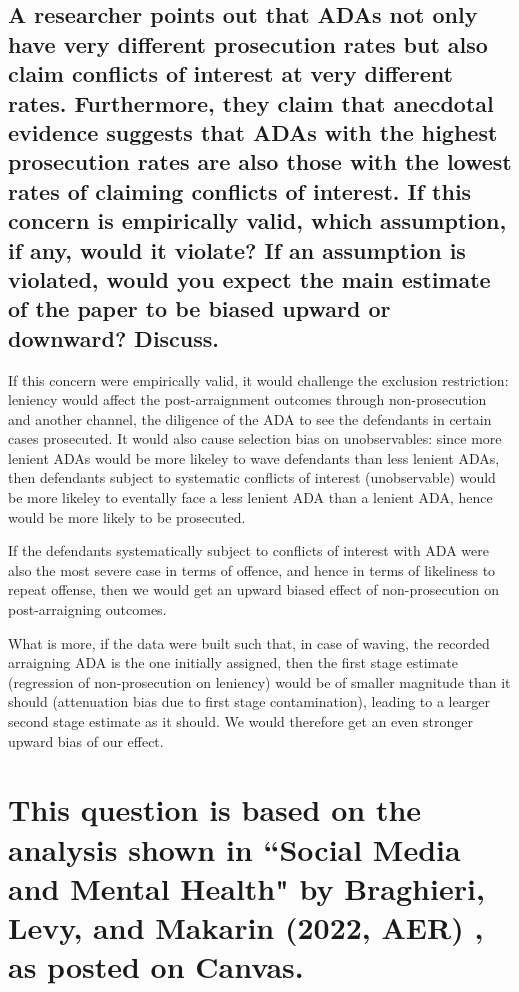\documentclass{article}
\begin{document}
\subsection{A researcher points out that ADAs not only have very different prosecution rates but also claim conflicts of interest at very different rates. Furthermore, they claim that anecdotal evidence suggests that ADAs with the highest prosecution rates are also those with the lowest rates of claiming conflicts of interest. If this concern is empirically valid, which assumption, if any, would it violate? If an assumption is violated, would you expect the main estimate of the paper to be biased upward or downward? Discuss.}

If this concern were empirically valid, it would challenge the exclusion restriction: leniency would affect the post-arraignment outcomes through non-prosecution and another channel, the diligence of the ADA to see the defendants in certain cases prosecuted. It would also cause selection bias on unobservables: since more lenient ADAs would be more likeley to wave defendants than less lenient ADAs, then defendants subject to systematic  conflicts of interest (unobservable) would be more likeley to eventally face a less lenient ADA than a lenient ADA, hence would be more likely to be prosecuted.

If the defendants systematically subject to conflicts of interest with ADA were also the most severe case in terms of offence, and hence in terms of likeliness to repeat offense, then we would get an upward biased effect of non-prosecution on post-arraigning outcomes.

What is more, if the data were built such that, in case of waving, the recorded arraigning ADA is the one initially assigned, then the first stage estimate (regression of non-prosecution on leniency) would be of smaller magnitude than it should (attenuation bias due to first stage contamination), leading to a learger second stage estimate as it should. We would therefore get an even stronger upward bias of our effect.


\section{This question is based on the analysis shown in “Social Media and Mental Health" by Braghieri, Levy, and Makarin (2022, AER) \cite{braghieri2022}, as posted on Canvas.}
\end{document}
